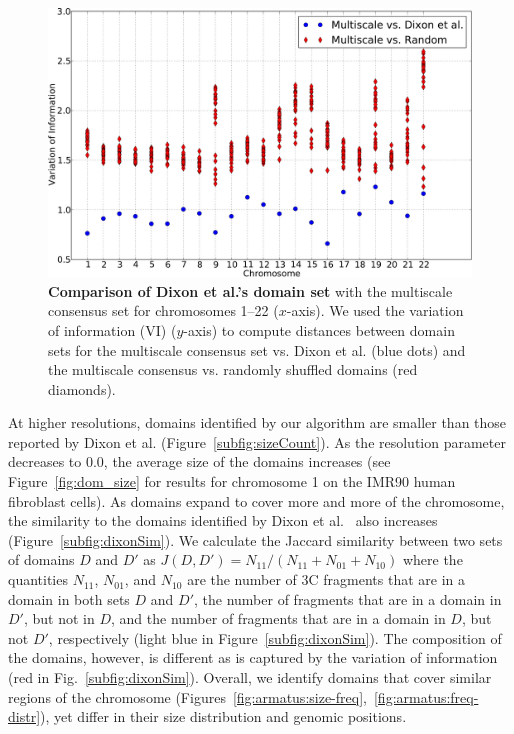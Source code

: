 \documentclass[12pt]{cmuthesis}
\begin{document}
  \begin{figure}[ht]
    \begin{center}
      \includegraphics[width=.9\linewidth]{figures/UsVsBingVI}
    \end{center}
    \caption{\textbf{Comparison of Dixon et al.'s domain set} with the multiscale consensus set for chromosomes 1--22 ($x$-axis). We used the variation of information (VI) ($y$-axis) to compute distances between domain sets for the multiscale consensus set vs. Dixon et al. (blue dots) and the multiscale consensus vs. randomly shuffled domains (red diamonds).}
    \label{fig:consensus_agreement}
  \end{figure}

  At higher resolutions, domains identified by our algorithm are smaller than those reported by Dixon et al. (Figure~\ref{subfig:sizeCount}). As the resolution parameter decreases to 0.0, the average size of the domains increases  (see Figure~\ref{fig:dom_size} for results for chromosome 1 on the IMR90 human fibroblast cells). As domains expand to cover more and more of the chromosome, the similarity to the domains identified by Dixon et al.~\cite{Dixon2012} also increases (Figure~\ref{subfig:dixonSim}). We calculate the Jaccard similarity between two sets of domains $D$ and $D'$ as $J(D, D') = N_{11} / (N_{11} + N_{01} + N_{10})$ where the quantities $N_{11}$, $N_{01}$, and $N_{10}$ are the number of 3C fragments that are in a domain in both sets $D$ and $D'$, the number of fragments that are in a domain in $D'$, but not in $D$, and the number of fragments that are in a domain in $D$, but not $D'$, respectively (light blue in Figure~\ref{subfig:dixonSim}). The composition of the domains, however, is different as is captured by the variation of information (red in Fig.~\ref{subfig:dixonSim}). Overall, we identify domains that cover similar regions of the chromosome (Figures~\ref{fig:armatus:size-freq},~\ref{fig:armatus:freq-distr}), yet differ in their size distribution and genomic positions.
\end{document}
